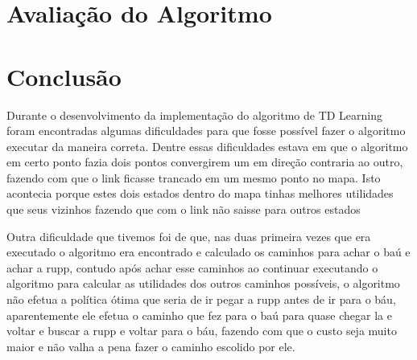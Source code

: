 \documentclass[letterpaper]{article}
\begin{document}
\section{Avaliação do Algoritmo}

\section{Conclusão}

Durante o desenvolvimento da implementação do algoritmo de TD Learning foram encontradas algumas dificuldades para que fosse possível fazer o algoritmo
executar da maneira correta. Dentre essas dificuldades estava em que o algoritmo em certo ponto fazia dois pontos convergirem um em direção contraria
ao outro, fazendo com que o link ficasse trancado em um mesmo ponto no mapa. Isto acontecia porque estes dois estados dentro do mapa tinhas melhores
utilidades que seus vizinhos fazendo que com o link não saisse para outros estados

Outra dificuldade que tivemos foi de que, nas duas primeira vezes que era executado o algoritmo era encontrado e calculado os caminhos para achar
o baú e achar a rupp, contudo após achar esse caminhos ao continuar executando o algoritmo para calcular as utilidades dos outros caminhos possíveis,
o algoritmo não efetua a política ótima que seria de ir pegar a rupp antes de ir para o báu, aparentemente ele efetua o caminho que fez para o baú para
quase chegar la e voltar e buscar a rupp e voltar para o báu, fazendo com que o custo seja muito maior e não valha a pena fazer o caminho escolido por
ele. 
\end{document}
